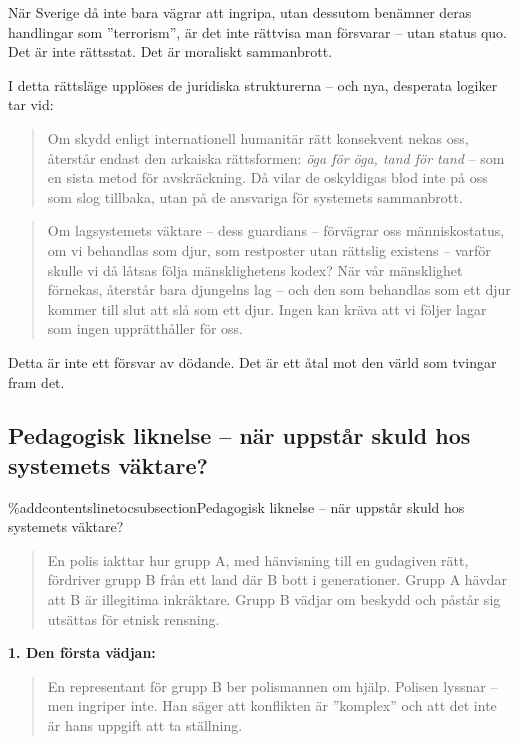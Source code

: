 När Sverige då inte bara vägrar att ingripa, utan dessutom benämner deras handlingar som ”terrorism”, är det inte rättvisa man försvarar – utan status quo. Det är inte rättsstat. Det är moraliskt sammanbrott.

I detta rättsläge upplöses de juridiska strukturerna – och nya, desperata logiker tar vid:

\begin{quote}
Om skydd enligt internationell humanitär rätt konsekvent nekas oss, återstår endast den arkaiska rättsformen: \textit{öga för öga, tand för tand} – som en sista metod för avskräckning. Då vilar de oskyldigas blod inte på oss som slog tillbaka, utan på de ansvariga för systemets sammanbrott.
\end{quote}

\begin{quote}
Om lagsystemets väktare – dess guardians – förvägrar oss människostatus, om vi behandlas som djur, som restposter utan rättslig existens – varför skulle vi då låtsas följa mänsklighetens kodex? När vår mänsklighet förnekas, återstår bara djungelns lag – och den som behandlas som ett djur kommer till slut att slå som ett djur. Ingen kan kräva att vi följer lagar som ingen upprätthåller för oss.
\end{quote}

Detta är inte ett försvar av dödande. Det är ett åtal mot den värld som tvingar fram det.




\subsection{Pedagogisk liknelse – när uppstår skuld hos systemets väktare?}
\%addcontentsline{toc}{subsection}{Pedagogisk liknelse – när uppstår skuld hos systemets väktare?}

\begin{quote}
En polis iakttar hur grupp A, med hänvisning till en gudagiven rätt, fördriver grupp B från ett land där B bott i generationer. Grupp A hävdar att B är illegitima inkräktare. Grupp B vädjar om beskydd och påstår sig utsättas för etnisk rensning.
\end{quote}

\textbf{1. Den första vädjan:}
\begin{quote}
En representant för grupp B ber polismannen om hjälp. Polisen lyssnar – men ingriper inte. Han säger att konflikten är ”komplex” och att det inte är hans uppgift att ta ställning.
\end{quote}

